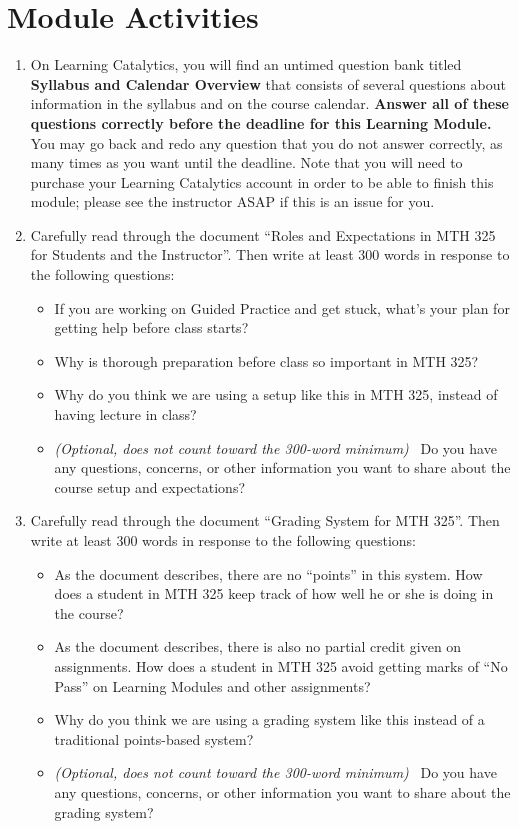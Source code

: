 \documentclass[11pt,letterpaper]{article}
\begin{document}
\section*{Module Activities}

\begin{enumerate}
	\item On Learning Catalytics, you will find an untimed question bank titled \textbf{Syllabus and Calendar Overview} that consists of several questions about information in the syllabus and on the course calendar. \textbf{Answer all of these questions correctly before the deadline for this Learning Module.} You may go back and redo any question that you do not answer correctly, as many times as you want until the deadline. Note that you will need to purchase your Learning Catalytics account in order to be able to finish this module; please see the instructor ASAP if this is an issue for you. 

	\item Carefully read through the document ``Roles and Expectations in MTH 325 for Students and the Instructor''. Then write at least 300 words in response to the following questions: 
		\begin{itemize}
			\item If you are working on Guided Practice and get stuck, what's your plan for getting help before class starts? 
			\item Why is thorough preparation before class so important in MTH 325? 
			\item Why do you think we are using a setup like this in MTH 325, instead of having lecture in class? 
			\item \emph{(Optional, does not count toward the 300-word minimum)} \ Do you have any questions, concerns, or other information you want to share about the course setup and expectations? 
		\end{itemize}

	\item Carefully read through the document ``Grading System for MTH 325''. Then write at least 300 words in response to the following questions: 
		\begin{itemize}
			\item As the document describes, there are no ``points'' in this system. How does a student in MTH 325 keep track of how well he or she is doing in the course? 
			\item As the document describes, there is also no partial credit given on assignments. How does a student in MTH 325 avoid getting marks of ``No Pass'' on Learning Modules and other assignments? 
			\item Why do you think we are using a grading system like this instead of a traditional points-based system? 
			\item \emph{(Optional, does not count toward the 300-word minimum)} \ Do you have any questions, concerns, or other information you want to share about the grading system? 
		\end{itemize}


\end{enumerate}
\end{document}
